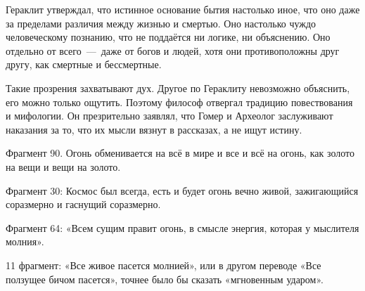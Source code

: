 Гераклит утверждал, что истинное основание бытия настолько иное, что оно даже за пределами различия между жизнью и смертью. Оно настолько чуждо человеческому познанию, что не поддаётся ни логике, ни объяснению. Оно отдельно от всего~---~даже от богов и людей, хотя они противоположны друг другу, как смертные и бессмертные.

Такие прозрения захватывают дух. Другое по Гераклиту невозможно объяснить, его можно только ощутить. Поэтому философ отвергал традицию повествования и мифологии. Он презрительно заявлял, что Гомер и Археолог заслуживают наказания за то, что их мысли вязнут в рассказах, а не ищут истину.

Фрагмент 90. Огонь обменивается на всё в мире и все
и всё на огонь, как золото на вещи и вещи на золото. 

Фрагмент 30: Космос был всегда, есть и будет огонь вечно
живой, зажигающийся соразмерно и гаснущий соразмерно. 

Фрагмент 64: «Всем сущим правит огонь, в смысле энергия, которая у мыслителя молния». 

11 фрагмент: «Все живое пасется молнией», или в другом переводе «Все ползущее бичом пасется», точнее было бы сказать «мгновенным ударом».


